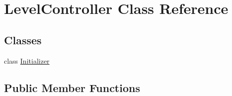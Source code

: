 \hypertarget{class_level_controller}{\section{Level\-Controller Class Reference}
\label{class_level_controller}
}
\subsection*{Classes}
\begin{DoxyCompactItemize}
\item 
class \hyperlink{class_level_controller_1_1_initializer}{Initializer}
\end{DoxyCompactItemize}
\subsection*{Public Member Functions}
